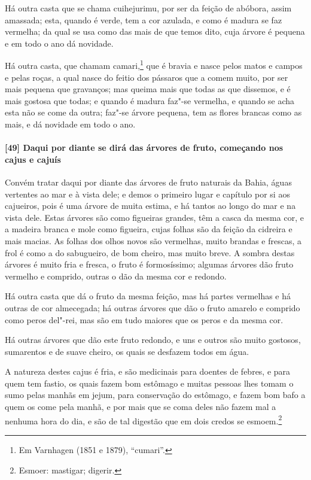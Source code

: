 \begin{linenumbers}
Há outra casta que se chama cuihejurimu, por ser da feição de abóbora, assim amassada;
esta, quando é verde, tem a cor azulada, e como é madura se faz vermelha; da qual se usa
como das mais de que temos dito, cuja árvore é pequena e em todo o ano dá novidade.

Há outra casta, que chamam camari,\footnote{ Em Varnhagen (1851 e 1879), ``cumari''.} que
é bravia e nasce pelos matos e campos e pelas roças, a qual nasce do feitio dos pássaros
que a comem muito, por ser mais pequena que gravanços; mas queima mais que todas as que
dissemos, e é mais gostosa que todas; e quando é madura faz"-se vermelha, e quando se acha
esta não se come da outra; faz"-se árvore pequena, tem as flores brancas como as mais, e dá
novidade em todo o ano.

\paragraph{[49] Daqui por diante se dirá das árvores de fruto, começando nos cajus e cajuís}\quad
Convém tratar daqui por diante das árvores de fruto naturais da Bahia, águas vertentes ao
mar e à vista dele; e demos o primeiro lugar e capítulo por si aos cajueiros, pois é uma
árvore de muita estima, e há tantos ao longo do mar e na vista dele. Estas árvores são
como figueiras grandes, têm a casca da mesma cor, e a madeira branca e mole como figueira,
cujas folhas são da feição da cidreira e mais macias. As folhas dos olhos novos são
vermelhas, muito brandas e frescas, a frol é como a do sabugueiro, de bom cheiro, mas
muito breve. A sombra destas árvores é muito fria e fresca, o fruto é formosíssimo;
algumas árvores dão fruto vermelho e comprido, outras o dão da mesma cor e redondo.

Há outra casta que dá o fruto da mesma feição, mas há partes vermelhas e há outras de cor
almecegada; há outras árvores que dão o fruto amarelo e comprido como peros del"-rei, mas
são em tudo maiores que os peros e da mesma cor.

Há outras árvores que dão este fruto redondo, e uns e outros são muito gostosos,
sumarentos e de suave cheiro, os quais se desfazem todos em água.

A natureza destes cajus é fria, e são medicinais para doentes de febres, e para quem tem
fastio, os quais fazem bom estômago e muitas pessoas lhes tomam o sumo pelas manhãs em
jejum, para conservação do estômago, e fazem bom bafo a quem os come pela manhã, e por
mais que se coma deles não fazem mal a nenhuma hora do dia, e são de tal digestão que em
dois credos se esmoem.\footnote{ Esmoer: mastigar; digerir.}



\end{linenumbers}
